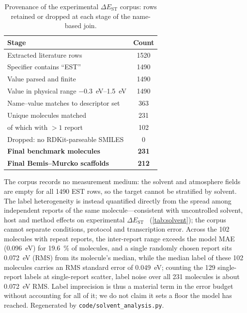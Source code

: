 \documentclass[final,3p,times,twocolumn]{elsarticle}
\begin{document}
\begin{table}[htbp]
  \centering
  \caption{Provenance of the experimental $\Delta E_\text{ST}$ corpus: rows
    retained or dropped at each stage of the name-based join.}
  \label{tab:provenance}
  \begin{tabular}{lc}
    \toprule
    Stage & Count \\
    \midrule
    Extracted literature rows                 & 1520 \\
    Specifier contains ``EST''                & 1490 \\
    Value parsed and finite                   & 1490 \\
    Value in physical range \qtyrange{-0.3}{1.5}{\electronvolt}   & 1490 \\
    Name--value matches to descriptor set     & 363 \\
    Unique molecules matched                  & 231 \\
    \quad of which with $>1$ report           & 102 \\
    Dropped: no RDKit-parseable SMILES        & 0 \\
    \midrule
    \textbf{Final benchmark molecules}        & \textbf{231} \\
    \textbf{Final Bemis--Murcko scaffolds}    & \textbf{212} \\
    \bottomrule
  \end{tabular}
\end{table}

The corpus records no measurement medium: the solvent and atmosphere fields are
empty for all \num{1490} EST rows, so the target cannot be stratified by solvent.
The label heterogeneity is instead quantified directly from the spread among
independent reports of the same molecule---consistent with
uncontrolled solvent, host and method effects on experimental
$\Delta E_\text{ST}$~\cite{Olivier2017} (\cref{tab:solvent}); the corpus cannot separate
conditions, protocol and transcription error. Across the \num{102}
molecules with repeat reports, the inter-report range exceeds the model MAE
(\qty{0.096}{\electronvolt}) for \qty{19.6}{\percent} of molecules, and a single
randomly chosen report sits \qty{0.072}{\electronvolt} (RMS) from its molecule's
median, while the median label of these \num{102} molecules carries an RMS standard
error of \qty{0.049}{\electronvolt}; counting the \num{129} single-report labels at
single-report scatter, label noise over all \num{231} molecules is about
\qty{0.072}{\electronvolt} RMS. Label imprecision is thus a material term in the error
budget without accounting for all of it; we do not claim it sets a floor the model has
reached. Regenerated by
\texttt{code/solvent\_analysis.py}.
\end{document}
